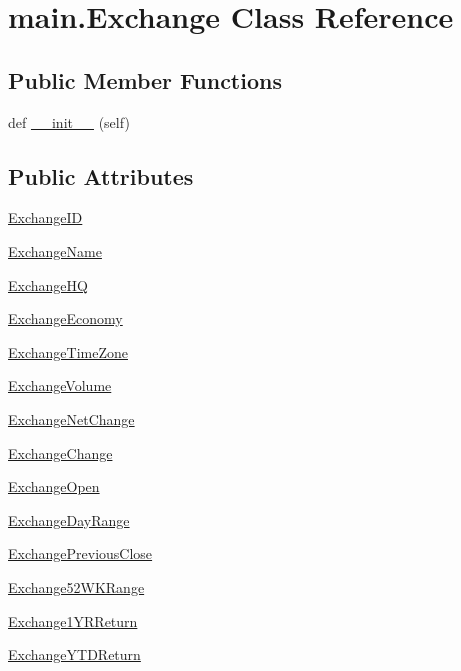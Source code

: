 \hypertarget{classmain_1_1_exchange}{}\section{main.\+Exchange Class Reference}
\label{classmain_1_1_exchange}
\subsection*{Public Member Functions}
\begin{DoxyCompactItemize}
\item 
def \hyperlink{classmain_1_1_exchange_a4ebdcd6e209900f917027732bfedb738}{\+\_\+\+\_\+init\+\_\+\+\_\+} (self)
\end{DoxyCompactItemize}
\subsection*{Public Attributes}
\begin{DoxyCompactItemize}
\item 
\hyperlink{classmain_1_1_exchange_a4b1b0771b0f427ee981883619f46e57c}{Exchange\+I\+D}
\item 
\hyperlink{classmain_1_1_exchange_a64b981b7264cf5e5a595ba1e42101eb8}{Exchange\+Name}
\item 
\hyperlink{classmain_1_1_exchange_a42cdbbe73644c9299de5b4e13091e195}{Exchange\+H\+Q}
\item 
\hyperlink{classmain_1_1_exchange_a1f28d52e8c8aaada475213a63a64e8cb}{Exchange\+Economy}
\item 
\hyperlink{classmain_1_1_exchange_ab68c3a3baf8465ac26661f56a9fa28b3}{Exchange\+Time\+Zone}
\item 
\hyperlink{classmain_1_1_exchange_acc3365ded1f538e66d855ba914a875a3}{Exchange\+Volume}
\item 
\hyperlink{classmain_1_1_exchange_a63fe0b101b1c921d6bc2ebdcfdf88369}{Exchange\+Net\+Change}
\item 
\hyperlink{classmain_1_1_exchange_a1b29c9c443ab9c5b5521d8f23e0e2ca6}{Exchange\+Change}
\item 
\hyperlink{classmain_1_1_exchange_a6701c1d49517d8fdb3f5336947ee973d}{Exchange\+Open}
\item 
\hyperlink{classmain_1_1_exchange_a595cf23b4463792d64581332dfaf8279}{Exchange\+Day\+Range}
\item 
\hyperlink{classmain_1_1_exchange_a3d66a07e2be392c093062bfe7bb916fb}{Exchange\+Previous\+Close}
\item 
\hyperlink{classmain_1_1_exchange_a33931e0285bcb1d0b5dd2f7c2bb9950b}{Exchange52\+W\+K\+Range}
\item 
\hyperlink{classmain_1_1_exchange_ad27ed7400398198313c50e652212d425}{Exchange1\+Y\+R\+Return}
\item 
\hyperlink{classmain_1_1_exchange_a87fff5cef509f114a947dd71a251fe58}{Exchange\+Y\+T\+D\+Return}
\end{DoxyCompactItemize}


